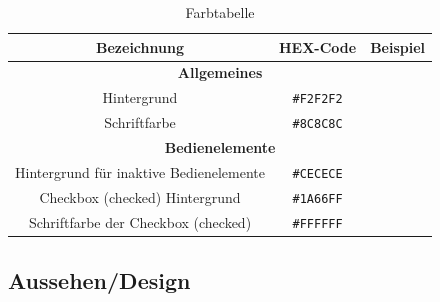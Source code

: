 \begin{table}
  \centering
    \begin{tabular}{ |c|c|c|}
     \hline
    \textbf{Bezeichnung} & \textbf{HEX-Code} & \textbf{Beispiel}\\
    \hline
    
    
    \hline
    \multicolumn{3}{|c|}{\textbf{Allgemeines}}\\
     \hline
    Hintergrund & \texttt{\#F2F2F2} &\cellcolor[HTML]{F2F2F2}\\
        \hline
         Schriftfarbe & \texttt{\#8C8C8C} &\cellcolor[HTML]{8C8C8C}\\
     \hline
     
     
      \hline
    \multicolumn{3}{|c|}{\textbf{Bedienelemente}}\\
     \hline
      Hintergrund für inaktive Bedienelemente & \texttt{\#CECECE} &\cellcolor[HTML]{CECECE}\\
     \hline
    Checkbox (checked) Hintergrund & \texttt{\#1A66FF} &\cellcolor[HTML]{1A66FF}\\
    \hline
     Schriftfarbe der Checkbox (checked) & \texttt{\#FFFFFF} &\cellcolor[HTML]{FFFFFF}\\
     \hline
    \end{tabular}
  \caption{Farbtabelle} \label{tab:farbtabelle}
\end{table}


\subsection{Aussehen/Design}




